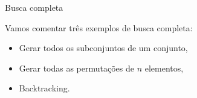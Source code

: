 \begin{frame}{Busca completa}

    Vamos comentar três exemplos de busca completa:
    \begin{itemize} \pause
        \item Gerar todos os subconjuntos de um conjunto, \pause
        \item Gerar todas as permutações de $n$ elementos, \pause
        \item Backtracking. \pause
    \end{itemize}
    
\end{frame}

